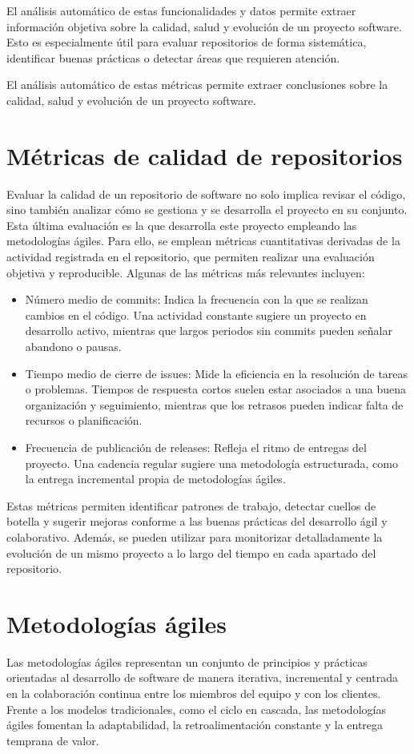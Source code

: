 El análisis automático de estas funcionalidades y datos permite extraer información objetiva sobre la calidad, salud y evolución de un proyecto software. Esto es especialmente útil para evaluar repositorios de forma sistemática, identificar buenas prácticas o detectar áreas que requieren atención.

El análisis automático de estas métricas permite extraer conclusiones sobre la calidad, salud y evolución de un proyecto software.

\section{Métricas de calidad de repositorios}
Evaluar la calidad de un repositorio de software no solo implica revisar el código, sino también analizar cómo se gestiona y se desarrolla el proyecto en su conjunto. Esta última evaluación es la que desarrolla este proyecto empleando las metodologías ágiles. Para ello, se emplean métricas cuantitativas derivadas de la actividad registrada en el repositorio, que permiten realizar una evaluación objetiva y reproducible. Algunas de las métricas más relevantes incluyen:

\begin{itemize}
\item Número medio de commits: Indica la frecuencia con la que se realizan cambios en el código. Una actividad constante sugiere un proyecto en desarrollo activo, mientras que largos periodos sin commits pueden señalar abandono o pausas.
\item Tiempo medio de cierre de issues: Mide la eficiencia en la resolución de tareas o problemas. Tiempos de respuesta cortos suelen estar asociados a una buena organización y seguimiento, mientras que los retrasos pueden indicar falta de recursos o planificación.
\item Frecuencia de publicación de releases: Refleja el ritmo de entregas del proyecto. Una cadencia regular sugiere una metodología estructurada, como la entrega incremental propia de metodologías ágiles.
\end{itemize}

Estas métricas permiten identificar patrones de trabajo, detectar cuellos de botella y sugerir mejoras conforme a las buenas prácticas del desarrollo ágil y colaborativo. Además, se pueden utilizar para monitorizar detalladamente la evolución de un mismo proyecto a lo largo del tiempo en cada apartado del repositorio.

\section{Metodologías ágiles}
Las metodologías ágiles representan un conjunto de principios y prácticas orientadas al desarrollo de software de manera iterativa, incremental y centrada en la colaboración continua entre los miembros del equipo y con los clientes. Frente a los modelos tradicionales, como el ciclo en cascada, las metodologías ágiles fomentan la adaptabilidad, la retroalimentación constante y la entrega temprana de valor.

